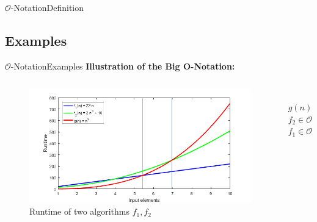 \begin{frame}{$\mathcal{O}$-Notation}{Definition}
\end{frame}


\subsection{Examples}

\begin{frame}{$\mathcal{O}$-Notation}{Examples}
  \textbf{Illustration of the Big O-Notation:}\\[-1.0em]
  \begin{columns}
    \begin{column}{0.9\textwidth}
      \begin{figure}[!h]
        \includegraphics[width=\linewidth]{Images/BigONotationRuntime.png}
        \caption{Runtime of two algorithms $f_1, f_2$}
        \label{fig:big_o_runtime_example}
      \end{figure}
    \end{column}
    \begin{column}{0.1\textwidth}
      \vspace{-4.75em}\\
      \hspace*{-2.5em}$g(n)$\\[2.0em]
      \hspace*{-2.5em}$f_2 \in \mathcal{O}(g)$\\[2.5em]
      \hspace*{-2.5em}$f_1 \in \mathcal{O}(g)$
    \end{column}
  \end{columns}
\end{frame}


